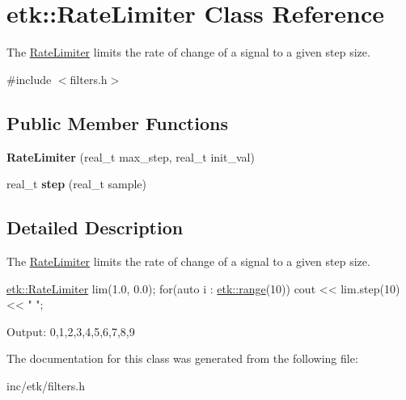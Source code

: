\hypertarget{classetk_1_1_rate_limiter}{\section{etk\-:\-:Rate\-Limiter Class Reference}
\label{classetk_1_1_rate_limiter}
}


The \hyperlink{classetk_1_1_rate_limiter}{Rate\-Limiter} limits the rate of change of a signal to a given step size.  




{\ttfamily \#include $<$filters.\-h$>$}

\subsection*{Public Member Functions}
\begin{DoxyCompactItemize}
\item 
\hypertarget{classetk_1_1_rate_limiter_a568bc9c401fa02d639715c110ca7ef51}{{\bfseries Rate\-Limiter} (real\-\_\-t max\-\_\-step, real\-\_\-t init\-\_\-val)}\label{classetk_1_1_rate_limiter_a568bc9c401fa02d639715c110ca7ef51}

\item 
\hypertarget{classetk_1_1_rate_limiter_aed6110a75c3acc8bc48fac9900c1beba}{real\-\_\-t {\bfseries step} (real\-\_\-t sample)}\label{classetk_1_1_rate_limiter_aed6110a75c3acc8bc48fac9900c1beba}

\end{DoxyCompactItemize}


\subsection{Detailed Description}
The \hyperlink{classetk_1_1_rate_limiter}{Rate\-Limiter} limits the rate of change of a signal to a given step size. 


\begin{DoxyCode}
\hyperlink{classetk_1_1_rate_limiter}{etk::RateLimiter} lim(1.0, 0.0);
\textcolor{keywordflow}{for}(\textcolor{keyword}{auto} i : \hyperlink{namespaceetk_aff39b0f367ee4d947e2e7d297ffd506b}{etk::range}(10))
    cout << lim.step(10) << \textcolor{stringliteral}{" "};
\end{DoxyCode}
 Output\-: 0,1,2,3,4,5,6,7,8,9 

The documentation for this class was generated from the following file\-:\begin{DoxyCompactItemize}
\item 
inc/etk/filters.\-h\end{DoxyCompactItemize}
